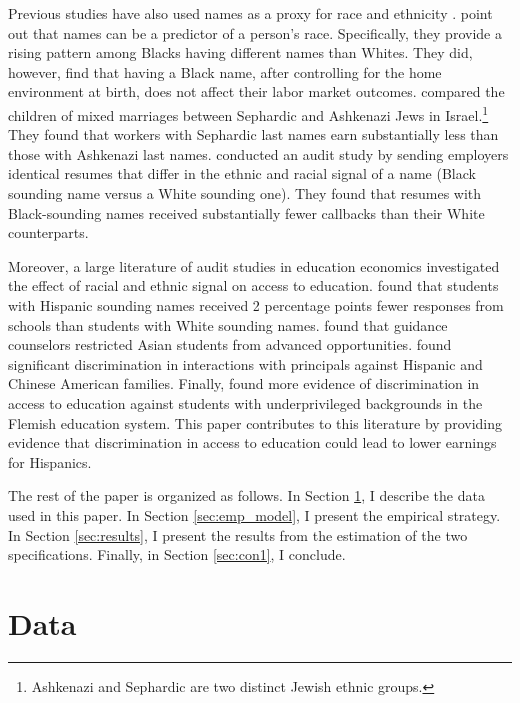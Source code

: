Previous studies have also used names as a proxy for race and ethnicity \autocite{fryer2004causes, rubinstein2014pride, bertrand2004emily}. \textcite{fryer2004causes} point out that names can be a predictor of a person's race. Specifically, they provide a rising pattern among Blacks having different names than Whites. They did, however, find that having a Black name, after controlling for the home environment at birth, does not affect their labor market outcomes. \textcite{rubinstein2014pride} compared the children of mixed marriages between Sephardic and Ashkenazi Jews in Israel.\footnote{Ashkenazi and Sephardic are two distinct Jewish ethnic groups.} They found that workers with Sephardic last names earn substantially less than those with Ashkenazi last names. \textcite{bertrand2004emily} conducted an audit study by sending employers identical resumes that differ in the ethnic and racial signal of a name (Black sounding name versus a White sounding one). They found that resumes with Black-sounding names received substantially fewer callbacks than their White counterparts. 

Moreover, a large literature of audit studies in education economics investigated the effect of racial and ethnic signal on access to education. \textcite{bergman2018education} found that students with Hispanic sounding names received 2 percentage points fewer responses from schools than students with White sounding names. \textcite{janssen2022guidance} found that guidance counselors restricted Asian students from advanced opportunities. \textcite{gaddis2024racial} found significant discrimination in interactions with principals against Hispanic and Chinese American families. Finally, \textcite{bourabain2023school} found more evidence of discrimination in access to education against students with underprivileged backgrounds in the Flemish education system. This paper contributes to this literature by providing evidence that discrimination in access to education could lead to lower earnings for Hispanics. 

The rest of the paper is organized as follows. In Section \ref{sec:data}, I describe the data used in this paper. In Section \ref{sec:emp_model}, I present the empirical strategy. In Section \ref{sec:results}, I present the results from the estimation of the two specifications. Finally, in Section \ref{sec:con1}, I conclude.

\section{Data}\label{sec:data}

